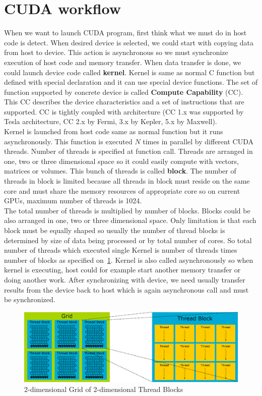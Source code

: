 \section{CUDA workflow}
When we want to launch CUDA program, first think what we must do in host code is detect. When desired device is selected, we could start with copying data from host to device. This action is asynchronous so we must synchronize execution of host code and memory transfer. When data transfer is done, we could launch device code called \textbf{kernel}. Kernel is same as normal C function but defined with special declaration and it can use special device functions. The set of function supported by concrete device is called \textbf{Compute Capability} (CC). This CC describes the device characteristics and a set of instructions that are supported. CC is tightly coupled with architecture (CC 1.x was supported by Tesla architecture, CC 2.x by Fermi, 3.x by Kepler, 5.x by Maxwell).\\
Kernel is launched from host code same as normal function but it runs asynchronously. This function is executed $N$ times in parallel by different CUDA threads. Number of threads is specified at function call. Threads are arranged in one, two or three dimensional space so it could easily compute with vectors, matrices or volumes. This bunch of threads is called \textbf{block}. The number of threads in block is limited because all threads in block must reside on the same core and must share the memory resources of appropriate core so on current GPUs, maximum number of threads is 1024.\\
The total number of threads is multiplied by number of blocks. Blocks could be also arranged in one, two or three dimensional space. Only limitation is that each block must be equally shaped so usually the number of thread blocks is determined by size of data being processed or by total number of cores. So total number of threads which executed single Kernel is number of threads times number of blocks as specified on~\ref{fig:cudagridthreadblock}. Kernel is also called asynchronously so when kernel is executing, host could for example start another memory transfer or doing another work. After synchronizing with device, we need usually transfer results from the device back to host which is again asynchronous call and must be synchronized.

\begin{figure}[h]
  \centering
  \includegraphics[width=1\linewidth]{img/CUDAthreadGridBlock.eps}
  \caption{2-dimensional Grid of 2-dimensional Thread Blocks}
  \label{fig:cudagridthreadblock}
\end{figure}


